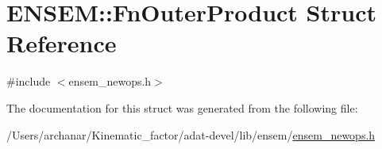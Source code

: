 \hypertarget{structENSEM_1_1FnOuterProduct}{}\section{E\+N\+S\+EM\+:\+:Fn\+Outer\+Product Struct Reference}
\label{structENSEM_1_1FnOuterProduct}


{\ttfamily \#include $<$ensem\+\_\+newops.\+h$>$}



The documentation for this struct was generated from the following file\+:\begin{DoxyCompactItemize}
\item 
/\+Users/archanar/\+Kinematic\+\_\+factor/adat-\/devel/lib/ensem/\mbox{\hyperlink{adat-devel_2lib_2ensem_2ensem__newops_8h}{ensem\+\_\+newops.\+h}}\end{DoxyCompactItemize}
